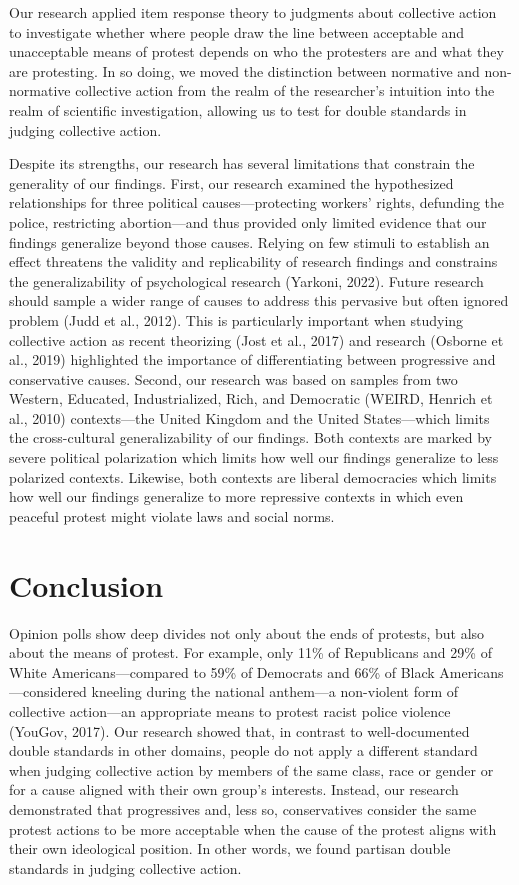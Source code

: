\documentclass[12pt, letterpaper]{article}
\begin{document}
Our research applied item response theory to judgments about collective
action to investigate whether where people draw the line between
acceptable and unacceptable means of protest depends on who the
protesters are and what they are protesting. In so doing, we moved the
distinction between normative and non-normative collective action from
the realm of the researcher's intuition into the realm of scientific
investigation, allowing us to test for double standards in judging
collective action.

Despite its strengths, our research has several limitations that
constrain the generality of our findings. First, our research examined
the hypothesized relationships for three political causes---protecting
workers' rights, defunding the police, restricting abortion---and thus
provided only limited evidence that our findings generalize beyond those
causes. Relying on few stimuli to establish an effect threatens the
validity and replicability of research findings and constrains the
generalizability of psychological research (Yarkoni, 2022). Future
research should sample a wider range of causes to address this pervasive
but often ignored problem (Judd et al., 2012). This is particularly
important when studying collective action as recent theorizing (Jost et
al., 2017) and research (Osborne et al., 2019) highlighted the
importance of differentiating between progressive and conservative
causes. Second, our research was based on samples from two Western,
Educated, Industrialized, Rich, and Democratic (WEIRD, Henrich et al.,
2010) contexts---the United Kingdom and the United States---which limits
the cross-cultural generalizability of our findings. Both contexts are
marked by severe political polarization which limits how well our
findings generalize to less polarized contexts. Likewise, both contexts
are liberal democracies which limits how well our findings generalize to
more repressive contexts in which even peaceful protest might violate
laws and social norms.

\hypertarget{conclusion}{%
\section{Conclusion}\label{conclusion}}

Opinion polls show deep divides not only about the ends of protests, but
also about the means of protest. For example, only 11\% of Republicans
and 29\% of White Americans---compared to 59\% of Democrats and 66\% of
Black Americans---considered kneeling during the national anthem---a
non-violent form of collective action---an appropriate means to protest
racist police violence (YouGov, 2017). Our research showed that, in
contrast to well-documented double standards in other domains, people do
not apply a different standard when judging collective action by members
of the same class, race or gender or for a cause aligned with their own
group's interests. Instead, our research demonstrated that progressives
and, less so, conservatives consider the same protest actions to be more
acceptable when the cause of the protest aligns with their own
ideological position. In other words, we found partisan double standards
in judging collective action.
\end{document}
